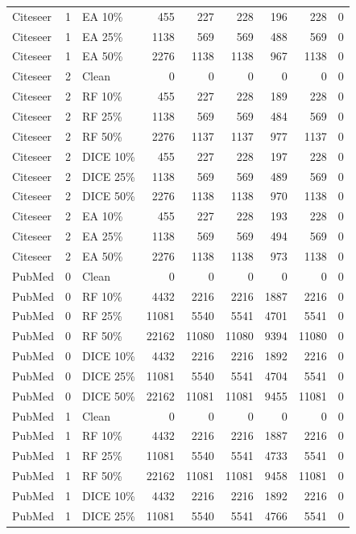 {\begin{longtable}{lr l rrrrrr}
Citeseer & 1 & EA 10\% & 455 & 227 & 228 & 196 & 228 & 0 \\
Citeseer & 1 & EA 25\% & 1138 & 569 & 569 & 488 & 569 & 0 \\
Citeseer & 1 & EA 50\% & 2276 & 1138 & 1138 & 967 & 1138 & 0 \\
Citeseer & 2 & Clean & 0 & 0 & 0 & 0 & 0 & 0 \\
Citeseer & 2 & RF 10\% & 455 & 227 & 228 & 189 & 228 & 0 \\
Citeseer & 2 & RF 25\% & 1138 & 569 & 569 & 484 & 569 & 0 \\
Citeseer & 2 & RF 50\% & 2276 & 1137 & 1137 & 977 & 1137 & 0 \\
Citeseer & 2 & DICE 10\% & 455 & 227 & 228 & 197 & 228 & 0 \\
Citeseer & 2 & DICE 25\% & 1138 & 569 & 569 & 489 & 569 & 0 \\
Citeseer & 2 & DICE 50\% & 2276 & 1138 & 1138 & 970 & 1138 & 0 \\
Citeseer & 2 & EA 10\% & 455 & 227 & 228 & 193 & 228 & 0 \\
Citeseer & 2 & EA 25\% & 1138 & 569 & 569 & 494 & 569 & 0 \\
Citeseer & 2 & EA 50\% & 2276 & 1138 & 1138 & 973 & 1138 & 0 \\
PubMed & 0 & Clean & 0 & 0 & 0 & 0 & 0 & 0 \\
PubMed & 0 & RF 10\% & 4432 & 2216 & 2216 & 1887 & 2216 & 0 \\
PubMed & 0 & RF 25\% & 11081 & 5540 & 5541 & 4701 & 5541 & 0 \\
PubMed & 0 & RF 50\% & 22162 & 11080 & 11080 & 9394 & 11080 & 0 \\
PubMed & 0 & DICE 10\% & 4432 & 2216 & 2216 & 1892 & 2216 & 0 \\
PubMed & 0 & DICE 25\% & 11081 & 5540 & 5541 & 4704 & 5541 & 0 \\
PubMed & 0 & DICE 50\% & 22162 & 11081 & 11081 & 9455 & 11081 & 0 \\
PubMed & 1 & Clean & 0 & 0 & 0 & 0 & 0 & 0 \\
PubMed & 1 & RF 10\% & 4432 & 2216 & 2216 & 1887 & 2216 & 0 \\
PubMed & 1 & RF 25\% & 11081 & 5540 & 5541 & 4733 & 5541 & 0 \\
PubMed & 1 & RF 50\% & 22162 & 11081 & 11081 & 9458 & 11081 & 0 \\
PubMed & 1 & DICE 10\% & 4432 & 2216 & 2216 & 1892 & 2216 & 0 \\
PubMed & 1 & DICE 25\% & 11081 & 5540 & 5541 & 4766 & 5541 & 0 \\

\end{longtable}}
